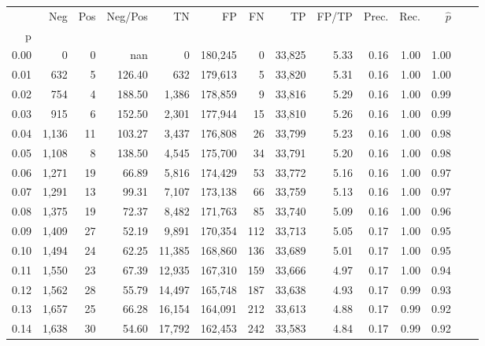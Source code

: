 \begin{tabular}{rrrrrrrrrrrrrr}
\toprule
{} &    Neg &    Pos & Neg/Pos &       TN &       FP &      FN &      TP & FP/TP & Prec. &  Rec. & $\hat{p}$ \\
p    &        &        &         &          &          &         &         &       &       &       &           \\
\midrule
0.00 &      0 &      0 &     nan &        0 &  180,245 &       0 &  33,825 &  5.33 &  0.16 &  1.00 &      1.00 \\
0.01 &    632 &      5 &  126.40 &      632 &  179,613 &       5 &  33,820 &  5.31 &  0.16 &  1.00 &      1.00 \\
0.02 &    754 &      4 &  188.50 &    1,386 &  178,859 &       9 &  33,816 &  5.29 &  0.16 &  1.00 &      0.99 \\
0.03 &    915 &      6 &  152.50 &    2,301 &  177,944 &      15 &  33,810 &  5.26 &  0.16 &  1.00 &      0.99 \\
0.04 &  1,136 &     11 &  103.27 &    3,437 &  176,808 &      26 &  33,799 &  5.23 &  0.16 &  1.00 &      0.98 \\
0.05 &  1,108 &      8 &  138.50 &    4,545 &  175,700 &      34 &  33,791 &  5.20 &  0.16 &  1.00 &      0.98 \\
0.06 &  1,271 &     19 &   66.89 &    5,816 &  174,429 &      53 &  33,772 &  5.16 &  0.16 &  1.00 &      0.97 \\
0.07 &  1,291 &     13 &   99.31 &    7,107 &  173,138 &      66 &  33,759 &  5.13 &  0.16 &  1.00 &      0.97 \\
0.08 &  1,375 &     19 &   72.37 &    8,482 &  171,763 &      85 &  33,740 &  5.09 &  0.16 &  1.00 &      0.96 \\
0.09 &  1,409 &     27 &   52.19 &    9,891 &  170,354 &     112 &  33,713 &  5.05 &  0.17 &  1.00 &      0.95 \\
0.10 &  1,494 &     24 &   62.25 &   11,385 &  168,860 &     136 &  33,689 &  5.01 &  0.17 &  1.00 &      0.95 \\
0.11 &  1,550 &     23 &   67.39 &   12,935 &  167,310 &     159 &  33,666 &  4.97 &  0.17 &  1.00 &      0.94 \\
0.12 &  1,562 &     28 &   55.79 &   14,497 &  165,748 &     187 &  33,638 &  4.93 &  0.17 &  0.99 &      0.93 \\
0.13 &  1,657 &     25 &   66.28 &   16,154 &  164,091 &     212 &  33,613 &  4.88 &  0.17 &  0.99 &      0.92 \\
0.14 &  1,638 &     30 &   54.60 &   17,792 &  162,453 &     242 &  33,583 &  4.84 &  0.17 &  0.99 &      0.92 \\

\end{tabular}
